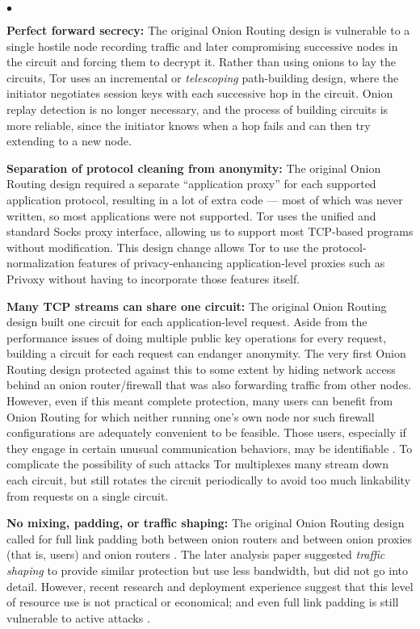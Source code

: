 \documentclass[times,10pt,twocolumn]{article}
\newenvironment{tightlist}{\begin{list}{$\bullet$}{
  \setlength{\itemsep}{0mm}
    \setlength{\parsep}{0mm}
    }}{\end{list}}
\begin{document}
\begin{tightlist}

\item \textbf{Perfect forward secrecy:} The original Onion Routing
design is vulnerable to a single hostile node recording traffic and later
compromising successive nodes in the circuit and forcing them to
decrypt it. 
Rather than using
onions to lay the circuits, Tor uses an incremental or \emph{telescoping}
path-building design, where the initiator negotiates session keys with
each successive hop in the circuit. Onion replay detection is no longer
necessary, and the process of building circuits is more reliable, since
the initiator knows when a hop fails and can then try extending to a new node.

\item \textbf{Separation of protocol cleaning from anonymity:}
The original Onion Routing design required a separate ``application
proxy'' for each
supported application protocol, resulting in a lot of extra code --- most
of which was never written, so most applications were not supported.
Tor uses the unified and standard Socks
\cite{socks4,socks5} proxy interface, allowing us to support most TCP-based
programs without modification.  This design change allows Tor to
use the protocol-normalization features of privacy-enhancing
application-level proxies such as Privoxy without having to
incorporate those features itself.

\item \textbf{Many TCP streams can share one circuit:} The original
Onion Routing design built one circuit for each application-level
request. 
Aside from the performance issues of doing multiple public key
operations for every request, building a circuit for each request can
endanger anonymity.
The very first Onion Routing design \cite{or-ih96} protected against
this to some extent by hiding network access behind an onion
router/firewall that was also forwarding traffic from other nodes.
However, even if this meant complete protection, many users can
benefit from Onion Routing for which neither running one's own node
nor such firewall configurations are adequately convenient to be
feasible. Those users, especially if they engage in certain unusual
communication behaviors, may be identifiable \cite{wright03}. To
complicate the possibility of such attacks Tor multiplexes many
stream down each circuit, but still rotates the circuit
periodically to avoid too much linkability from requests on a single
circuit.

\item \textbf{No mixing, padding, or traffic shaping:} 
The original Onion Routing
design called for full link padding both between onion routers and between
onion proxies (that is, users) and onion routers \cite{or-jsac98}. The
later analysis paper \cite{or-pet00} suggested \emph{traffic shaping}
to provide similar protection but use less bandwidth, but did not go
into detail.  However, recent research \cite{econymics} and deployment
experience \cite{freedom21-security} suggest that this level of resource
use is not practical or economical; and even full link padding is still
vulnerable to active attacks \cite{defensive-dropping}.


\end{tightlist}
\end{document}
